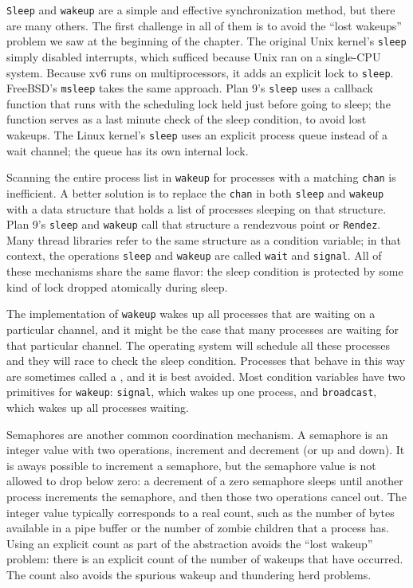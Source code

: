 \lstinline{Sleep}
and
\lstinline{wakeup}
are a simple and effective synchronization method,
but there are many others.
The first challenge in all of them is to
avoid the ``lost wakeups'' problem we saw at the
beginning of the chapter.
The original Unix kernel's
\lstinline{sleep}
simply disabled interrupts,
which sufficed because Unix ran on a single-CPU system.
Because xv6 runs on multiprocessors,
it adds an explicit lock to
\lstinline{sleep}.
FreeBSD's
\lstinline{msleep}
takes the same approach.
Plan 9's 
\lstinline{sleep}
uses a callback function that runs with the scheduling
lock held just before going to sleep;
the function serves as a last minute check
of the sleep condition, to avoid lost wakeups.
The Linux kernel's
\lstinline{sleep}
uses an explicit process queue instead of
a wait channel; the queue has its own internal lock.

Scanning the entire process list in
\lstinline{wakeup}
for processes with a matching
\lstinline{chan}
is inefficient.  A better solution is to
replace the
\lstinline{chan}
in both
\lstinline{sleep}
and
\lstinline{wakeup}
with a data structure that holds
a list of processes sleeping on that structure.
Plan 9's
\lstinline{sleep}
and
\lstinline{wakeup}
call that structure a rendezvous point or
\lstinline{Rendez}.
Many thread libraries refer to the same
structure as a condition variable;
in that context, the operations
\lstinline{sleep}
and
\lstinline{wakeup}
are called
\lstinline{wait}
and
\lstinline{signal}.
All of these mechanisms share the same
flavor: the sleep condition is protected by
some kind of lock dropped atomically during sleep.

The implementation of
\lstinline{wakeup}
wakes up all processes that are waiting on a particular channel, and it might be
the case that many processes are waiting for that particular channel.   The
operating system will schedule all these processes and they will race to check
the sleep condition.  Processes that behave in this way are sometimes called a
,
and it is best avoided.
Most condition variables have two primitives for
\lstinline{wakeup}:
\lstinline{signal},
which wakes up one process, and
\lstinline{broadcast},
which wakes up all processes waiting.

Semaphores are another common coordination
mechanism.
A semaphore is an integer value with two operations,
increment and decrement (or up and down).
It is aways possible to increment a semaphore,
but the semaphore value is not allowed to drop below zero:
a decrement of a zero semaphore sleeps until
another process increments the semaphore,
and then those two operations cancel out.
The integer value typically corresponds to a real
count, such as the number of bytes available in a pipe buffer
or the number of zombie children that a process has.
Using an explicit count as part of the abstraction
avoids the ``lost wakeup'' problem:
there is an explicit count of the number
of wakeups that have occurred.
The count also avoids the spurious wakeup
and thundering herd problems.


